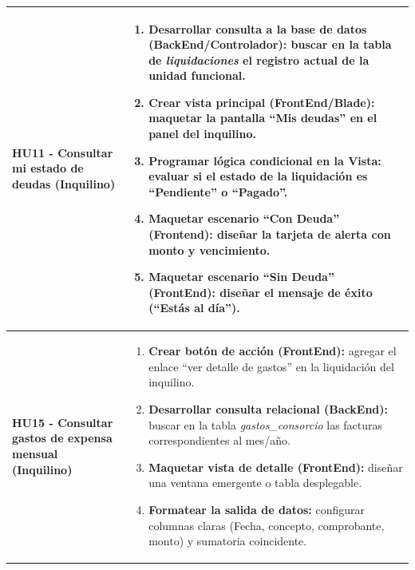 \begin{longtable}{|p{4.5cm}|p{10.5cm}|}
    \\ \hline

        \textbf{HU11 - Consultar mi estado de deudas (Inquilino)} 
        
        & 

            \begin{enumerate}[leftmargin=*,nosep]
                \item \textbf{Desarrollar consulta a la base de datos (BackEnd/Controlador):} buscar en la tabla de \textit{liquidaciones} el registro actual de la unidad funcional.
                \item \textbf{Crear vista principal (FrontEnd/Blade):} maquetar la pantalla ``Mis deudas'' en el panel del inquilino.
                \item \textbf{Programar lógica condicional en la Vista:} evaluar si el estado de la liquidación es ``Pendiente'' o ``Pagado''.
                \item \textbf{Maquetar escenario ``Con Deuda'' (Frontend):} diseñar la tarjeta de alerta con monto y vencimiento.
                \item \textbf{Maquetar escenario ``Sin Deuda'' (FrontEnd):} diseñar el mensaje de éxito (``Estás al día'').
            \end{enumerate} 
        
    \\ \hline

        \textbf{HU15 - Consultar gastos de expensa mensual (Inquilino)} 
        
        & 

            \begin{enumerate}[leftmargin=*,nosep]
                \item \textbf{Crear botón de acción (FrontEnd):} agregar el enlace ``ver detalle de gastos'' en la liquidación del inquilino.
                \item \textbf{Desarrollar consulta relacional (BackEnd):} buscar en la tabla \textit{gastos\_consorcio} las facturas correspondientes al mes/año.
                \item \textbf{Maquetar vista de detalle (FrontEnd):} diseñar una ventana emergente o tabla desplegable.
                \item \textbf{Formatear la salida de datos:} configurar columnas claras (Fecha, concepto, comprobante, monto) y sumatoria coincidente.
            \end{enumerate} 
        
    \\ \hline


\end{longtable}

